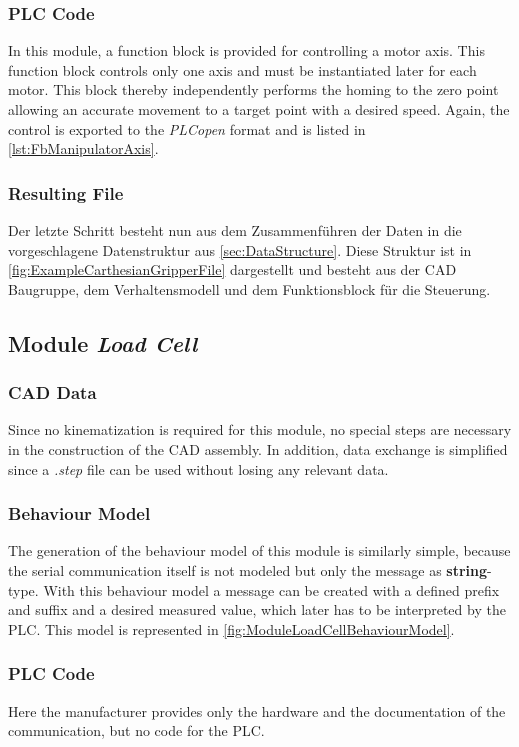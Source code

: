 	
	\subsubsection{PLC Code}
	In this module, a function block is provided for controlling a motor axis. This function block controls only one axis and must be instantiated later for each motor. This block thereby independently performs the homing to the zero point allowing an accurate movement to a target point with a desired speed. Again, the control is exported to the \textit{PLCopen} format and is listed in \autoref{lst:FbManipulatorAxis}.
	
	\subsubsection{Resulting File}
	Der letzte Schritt besteht nun aus dem Zusammenführen der Daten in die vorgeschlagene Datenstruktur aus \autoref{sec:DataStructure}. Diese Struktur ist in \autoref{fig:ExampleCarthesianGripperFile} dargestellt und besteht aus der CAD Baugruppe, dem Verhaltensmodell und dem Funktionsblock für die Steuerung. 

    
\subsection{Module \textit{Load Cell}}
    \subsubsection{CAD Data}
    Since no kinematization is required for this module, no special steps are necessary in the construction of the CAD assembly. In addition, data exchange is simplified since a \textit{.step} file can be used without losing any relevant data.
    
    \subsubsection{Behaviour Model}
    The generation of the behaviour model of this module is similarly simple, because the serial communication itself is not modeled but only the message as \textbf{string}-type. With this behaviour model a message can be created with a defined prefix and suffix and a desired measured value, which later has to be interpreted by the PLC. This model is represented in \autoref{fig:ModuleLoadCellBehaviourModel}.

	\subsubsection{PLC Code}
	Here the manufacturer provides only the hardware and the documentation of the communication, but no code for the PLC. 
	
